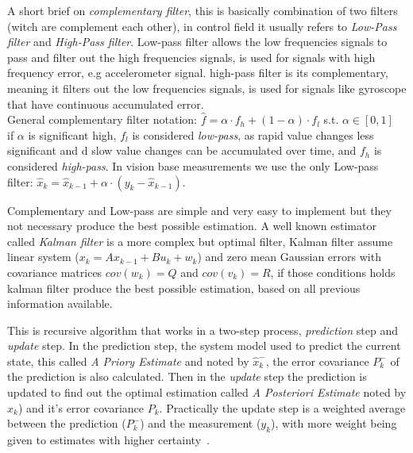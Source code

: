 \documentclass[ twoside, 12pt ]{article}
\begin{document}
A short brief on \textit{complementary filter}, this is basically combination of two filters (witch are complement each other), in control field it usually refers to \textit{Low-Pass filter} and \textit{High-Pass filter}.
Low-pass filter allows the low frequencies signals to pass and filter out the high frequencies signals, is used for signals with high frequency error, e.g accelerometer signal.
high-pass filter is its complementary, meaning it filters out the low frequencies signals, is used for signals like gyroscope that have continuous accumulated error.
\\General complementary filter notation: $\hat{f} = \alpha \cdot f_h + (1-\alpha) \cdot f_l$ s.t. $\alpha \in [0,1]$
\\if $\alpha$ is significant high, $f_l$ is considered \textit{low-pass}, as rapid value changes less significant and d slow value changes can be accumulated over time, and $f_h$ is considered \textit{high-pass}.
In vision base measurements we use the only Low-pass filter:
$ \hat{x}_k = \hat{x}_{k-1} + \alpha \cdot (y_k - \hat{x}_{k-1}) $.

Complementary and Low-pass are simple and very easy to implement but they not necessary produce the best possible estimation.
A well known estimator called \textit{Kalman filter} is a more complex but optimal filter, Kalman filter assume linear system ($x_{k}=Ax_{k-1} + Bu_{k} + w_{k}$) and zero mean Gaussian errors with covariance matrices $cov(w_k)=Q$ and $cov(v_k)=R$, if those conditions holds kalman filter produce the best possible estimation, based on all previous information available.

This is recursive algorithm that works in a two-step process, \textit{prediction} step and \textit{update} step. 
In the prediction step, the system model used to predict the current state, this called \textit{A Priory Estimate} and noted by $\hat{x}_k^-$,
the error covariance $P_k^-$ of the prediction is also calculated.
Then in the \textit{update} step the prediction is updated to find out the optimal estimation called \textit{A Posteriori Estimate} noted by $\hat{x}_k$) and it's error covariance $P_k$.
Practically the update step is a weighted average between the prediction ($P_k^-$) and the measurement ($y_k$), with more weight being given to estimates with higher certainty~\cite{Kalman-filter}. 
\end{document}
